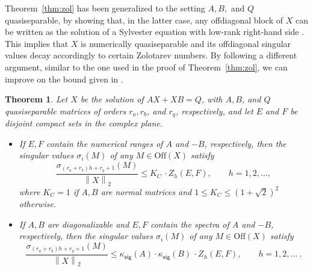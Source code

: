 \documentclass[a4paper,10pt]{article}
\newcommand{\norm}[1]{\left\lVert#1\right\rVert}
\newtheorem{theorem}[definition]{Theorem}
\begin{document}
Theorem~\ref{thm:zol} has been generalized to the setting $A,B,$ and $Q$ quasiseparable, by showing that, in the latter case, any offdiagonal block of $X$ can be written as the solution of a Sylvester equation with low-rank right-hand side \cite[Theorem 2.7]{massei18}. This implies that $X$ is numerically quasiseparable and its offdiagonal singular values decay accordingly to certain Zolotarev numbers. By following a different argument, similar to the one used in the proof of Theorem~\ref{thm:zol}, we can improve on the bound given in \cite[Theorem 2.7]{massei18}.
\begin{theorem}\label{thm:quasi-zol}
Let $X$ be the solution of $AX+XB=Q$, with $A,B$, and $Q$ quasiseparable matrices of orders  $r_a,r_b$, and $r_q$, respectively, and let 
$E$ and $F$ be disjoint compact sets in the complex plane. 
\begin{itemize}
	\item[$(i)$] If $E,F$ contain
	the numerical ranges of $A$ and $-B$, respectively, then the singular values $\sigma_i(M)$ of any $M\in\mathrm{Off}(X)$ satisfy
	\[
	\frac{\sigma_{(r_a+r_b)h+r_q+1}(M)}{\norm{ X}_2}\leq  K_C\,\cdot Z_h(E,F),\qquad h=1,2,\dots, 
	\]
	where $K_C = 1$ if $A,B$ are normal matrices and $1\le K_C \le (1+\sqrt{2})^2$ otherwise.
	\item[$(ii)$] If $A,B$ are diagonalizable and $E,F$ contain
	the spectra of $A$ and $-B$, respectively, then the singular values $\sigma_i(M)$ of any $M\in\mathrm{Off}(X)$ satisfy
	\[
	\frac{\sigma_{(r_a+r_b)h+r_q+1}(M)}{\norm{ X}_2}\leq  \kappa_{\mathsf{eig}}(A)\cdot \kappa_{\mathsf{eig}}(B)\,\cdot Z_h(E,F),\qquad h=1,2,\dots\ .
	\]
\end{itemize}	
\end{theorem}
\end{document}
